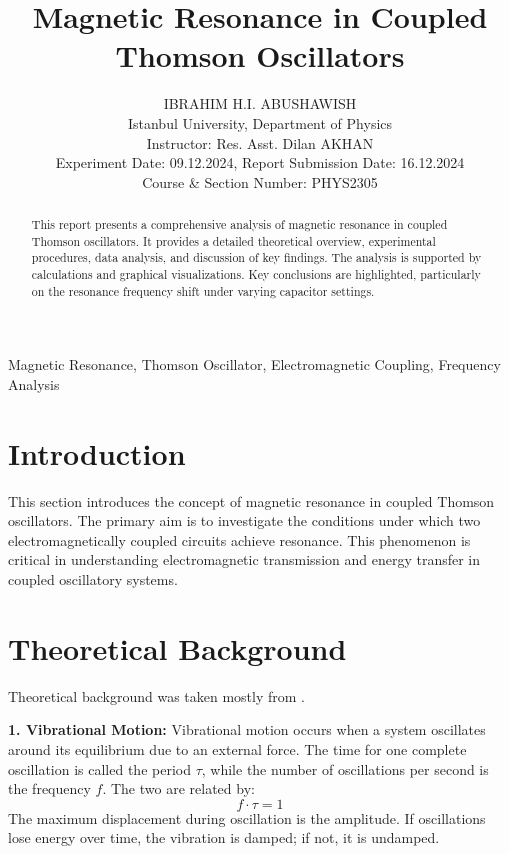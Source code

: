 \documentclass[journal]{IEEEtran}
\begin{document}
\title{Magnetic Resonance in Coupled Thomson Oscillators}
\author{IBRAHIM H.I. ABUSHAWISH \\
Istanbul University, Department of Physics \\
Instructor: Res. Asst. Dilan AKHAN  \\
Experiment Date: 09.12.2024, Report Submission Date: 16.12.2024 \\
Course \& Section Number: PHYS2305}

\maketitle


\begin{abstract}
This report presents a comprehensive analysis of magnetic resonance in coupled Thomson oscillators. It provides a detailed theoretical overview, experimental procedures, data analysis, and discussion of key findings. The analysis is supported by calculations and graphical visualizations. Key conclusions are highlighted, particularly on the resonance frequency shift under varying capacitor settings.
\end{abstract}


\begin{IEEEkeywords}
Magnetic Resonance, Thomson Oscillator, Electromagnetic Coupling, Frequency Analysis
\end{IEEEkeywords}


\section{Introduction}
This section introduces the concept of magnetic resonance in coupled Thomson oscillators. The primary aim is to investigate the conditions under which two electromagnetically coupled circuits achieve resonance. This phenomenon is critical in understanding electromagnetic transmission and energy transfer in coupled oscillatory systems.
\section{Theoretical Background}
Theoretical background was taken mostly from \cite{lab_manual}.

\textbf{1. Vibrational Motion:}
Vibrational motion occurs when a system oscillates around its equilibrium due to an external force. The time for one complete oscillation is called the period \(\tau\), while the number of oscillations per second is the frequency \(f\). The two are related by:
\begin{equation}
    f \cdot \tau = 1
\end{equation}
The maximum displacement during oscillation is the amplitude. If oscillations lose energy over time, the vibration is damped; if not, it is undamped.
\end{document}
